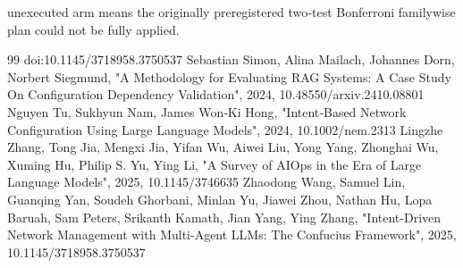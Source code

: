 \documentclass[conference]{IEEEtran}
\begin{document}
unexecuted arm means the originally preregistered two‑test Bonferroni familywise plan could not be fully applied.

\begin{thebibliography}{99}
 doi:10.1145/3718958.3750537
 Sebastian Simon, Alina Mailach, Johannes Dorn, Norbert Siegmund, "A Methodology for Evaluating RAG Systems: A Case Study On Configuration Dependency Validation", 2024, 10.48550/arxiv.2410.08801
 Nguyen Tu, Sukhyun Nam, James Won‐Ki Hong, "Intent‐Based Network Configuration Using Large Language Models", 2024, 10.1002/nem.2313
 Lingzhe Zhang, Tong Jia, Mengxi Jia, Yifan Wu, Aiwei Liu, Yong Yang, Zhonghai Wu, Xuming Hu, Philip S. Yu, Ying Li, "A Survey of AIOps in the Era of Large Language Models", 2025, 10.1145/3746635
 Zhaodong Wang, Samuel Lin, Guanqing Yan, Soudeh Ghorbani, Minlan Yu, Jiawei Zhou, Nathan Hu, Lopa Baruah, Sam Peters, Srikanth Kamath, Jian Yang, Ying Zhang, "Intent-Driven Network Management with Multi-Agent LLMs: The Confucius Framework", 2025, 10.1145/3718958.3750537
\end{thebibliography}
\end{document}
